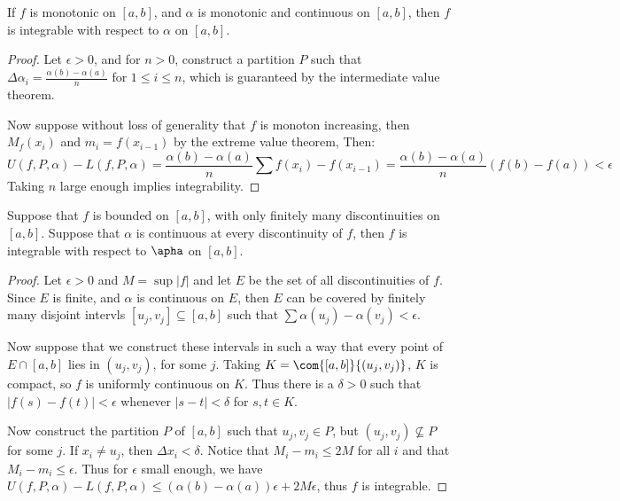 \begin{theorem}\label{7.1.8}
    If $f$ is monotonic on  $[a,b]$, and  $\alpha$ is monotonic and continuous
    on  $[a,b]$, then  $f$ is integrable with respect to  $\alpha$ on  $[a,b]$.
\end{theorem}
\begin{proof}
    Let $\epsilon>0$, and for  $n>0$, construct a partition  $P$ such that
    $\Delta{\alpha_i}=\frac{\alpha(b)-\alpha(a)}{n}$ for $1 \leq i \leq n$,
    which is guaranteed by the intermediate value theorem.

    Now suppose without loss of generality that $f$ is monoton increasing, then
    $M_f(x_i)$ and  $m_i=f(x_{i-1})$  by the extreme value theorem, Then:
            \begin{equation*}
            U(f,P,\alpha)-L(f,P,\alpha)=\frac{\alpha(b)-\alpha(a)}{n}\sum{f(x_i)-f(x_{i-1})}=
                \frac{\alpha(b)-\alpha(a)}{n}(f(b)-f(a))<\epsilon
        \end{equation*}
    Taking $n$ large enough
    implies integrability.
\end{proof}

\begin{theorem}\label{7.1.9}
    Suppose that $f$ is bounded on  $[a,b]$, with only finitely many
    discontinuities on  $[a,b]$. Suppose that  $\alpha$ is continuous at every
    discontinuity of  $f$, then  $f$ is integrable with respect to  $\apha$ on
    $[a,b]$.
\end{theorem}
\begin{proof}
    Let $\epsilon>0$ and  $M=\sup{|f|}$ and let  $E$ be the set of all
    discontinuities of  $f$. Since  $E$ is finite, and  $\alpha$ is continuous
    on  $E$, then  $E$ can be covered by finitely many disjoint intervls
    $[u_j,v_j] \subseteq [a,b]$ such that
    $\sum{\alpha(u_j)-\alpha(v_j)}<\epsilon$.

    Now suppose that we construct these intervals in such a way that every point
    of $E \cap [a,b]$ lies in $(u_j,v_j)$, for some  $j$. Taking
    $K=\com{[a,b]}{(u_j,v_j)}$,  $K$ is compact, so  $f$ is uniformly continuous
    on $K$. Thus there is a $\delta>0$ such that  $|f(s)-f(t)|<\epsilon$
    whenever  $|s-t|<\delta$ for  $s,t \in K$.

    Now construct the partition  $P$ of $[a,b]$ such that $u_j,v_j \in P$, but
    $(u_j,v_j) \not\subseteq P$ for some  $j$. If  $x_i \neq u_j$, then
    $\Delta{x_i}<\delta$. Notice that  $M_i-m_i \leq 2M$ for all  $i$ and that
    $M_i-m_i \leq \epsilon$. Thus for  $\epsilon$ small enough, we have
    $U(f,P,\alpha)-L(f,P,\alpha) \leq (\alpha(b)-\alpha(a))\epsilon+2M\epsilon$,
    thus $f$ is integrable.
\end{proof}

